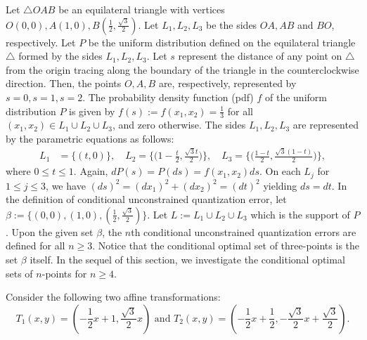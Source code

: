 \documentclass[12pt, reqno]{amsart}
\theoremstyle{plain}
\theoremstyle{definition}
\newcommand{\uu}{\cup}%
\newcommand{\ii}{\cap}%
\newcommand{\set}[1]{\{#1\}}%
\newcommand{\ga}{\alpha}
\newcommand{\gb}{\beta}
\newcommand{\te}{\text}%
\newcommand{\tri}{\triangle}
\begin{document}
Let $\tri OAB$ be an equilateral triangle with vertices $O(0,0), A(1, 0), B(\frac 12,\frac{\sqrt 3}2)$. Let $L_1, L_2, L_3$ be the sides $OA, AB$ and $BO$, respectively. Let $P$ be the uniform distribution defined on the equilateral triangle $\tri$ formed by the sides $L_1, L_2, L_3$. Let $s$ represent the distance of any point on $\tri$ from the origin tracing along the boundary of the triangle in the counterclockwise direction. Then, the points $O, A, B$ are, respectively, represented by $s=0, s=1, s=2$. 
 The probability density function (pdf) $f$ of the uniform distribution $P$ is given by $f(s):=f(x_1, x_2)=\frac 1{3}$ for all $(x_1, x_2)\in L_1\uu L_2\uu L_3$, and zero otherwise. The sides $L_1, L_2, L_3$ are represented by the parametric equations as follows:
\begin{align*}
L_1&=\set {(t, 0)},  \quad L_2=\Big\{\Big (1-\frac t 2,\frac{\sqrt{3} t}{2}\Big)\Big\}, \quad L_3=\Big\{\Big(\frac{1-t}{2}, \frac{\sqrt{3}(1-t)}{2}\Big)\Big\},
\end{align*}
where $0\leq t\leq 1$. 
Again, $dP(s)=P(ds)=f(x_1, x_2) ds$. On each $L_j$ for $1\leq j\leq 3$, we have $(ds)^2=(dx_1)^2+(dx_2)^2=(dt)^2$ yielding $ds=dt$. In the definition of conditional unconstrained quantization error, let $\gb:=\set{(0, 0), (1, 0), (\frac 12, \frac {\sqrt {3}} 2)}$. Let $L:=L_1\uu L_2\uu L_3$ which is the support of $P$. Upon the given set $\gb$, the $n$th conditional unconstrained quantization errors are defined for all $n\geq 3$.
Notice that the conditional optimal set of three-points is the set $\gb$ itself. In the sequel of this section, we investigate the conditional optimal sets of $n$-points for $n\geq 4$. 

 Consider the following two affine transformations: 
\begin{equation} \label{eqM1} 
T_1(x, y)=(-\frac 12 x+1, \frac{\sqrt 3}{2} x) \te{ and } T_2(x, y)=(-\frac 12 x+\frac 12, -\frac{\sqrt 3}2 x+\frac {\sqrt 3} 2).
\end{equation} 
\end{document}
